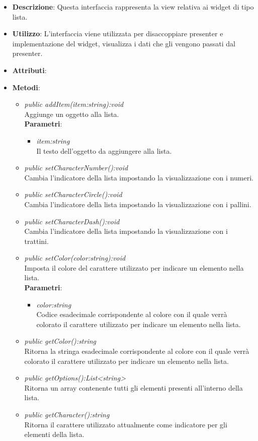\begin{itemize}
\item \textbf{Descrizione}: Questa interfaccia rappresenta la view relativa ai widget di tipo lista.
\item \textbf{Utilizzo}: L'interfaccia viene utilizzata per disaccoppiare presenter e implementazione del widget, visualizza i dati che gli vengono passati dal presenter.
\item \textbf{Attributi}:
\item \textbf{Metodi}:
	\begin{itemize}
	\item \textit{public addItem(item:string):void}\\
	Aggiunge un oggetto alla lista.
		\\ \textbf{Parametri}: \begin{itemize}
		\item \textit{item:string}\\
		Il testo dell'oggetto da aggiungere alla lista.
		\end{itemize} 
	\item \textit{public setCharacterNumber():void}\\
	Cambia l'indicatore della lista impostando la visualizzazione con i numeri.
	\item \textit{public setCharacterCircle():void}\\
	Cambia l'indicatore della lista impostando la visualizzazione con i pallini.
	\item \textit{public setCharacterDash():void}\\
	Cambia l'indicatore della lista impostando la visualizzazione con i trattini.
	\item \textit{public setColor(color:string):void}\\
		Imposta il colore del carattere utilizzato per indicare un elemento nella lista.
		\\ \textbf{Parametri}: \begin{itemize}
		\item \textit{color:string}\\
		Codice esadecimale corrispondente al colore con il quale verrà colorato il carattere utilizzato per indicare un elemento nella lista.
		\end{itemize} 
	\item \textit{public getColor():string}\\
	Ritorna la stringa esadecimale corrispondente al colore con il quale verrà colorato il carattere utilizzato per indicare un elemento nella lista.
	\item \textit{public getOptions():List<string>}\\
	Ritorna un array contenente tutti gli elementi presenti all'interno della lista.
	\item \textit{public getCharacter():string}\\
	Ritorna il carattere utilizzato attualmente come indicatore per gli elementi della lista.
	\end{itemize}
\end{itemize}

